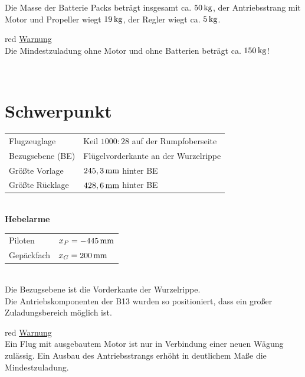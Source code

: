 \vspace{0.5cm}
Die Masse der Batterie Packs beträgt insgesamt ca. $\unit[50]{kg}$, der Antriebsstrang mit Motor und Propeller wiegt $\unit[19]{kg}$, der Regler wiegt ca. $\unit[5]{kg}$.\\

\begin{color}{red}
\large{\underline{Warnung}}\\
Die Mindestzuladung ohne Motor und ohne Batterien beträgt ca. $\unit[150]{kg}$!
\end{color}\\


\section{Schwerpunkt}
\begin{tabular}{l l}
Flugzeuglage & Keil $1000:28$ auf der Rumpfoberseite\\
Bezugsebene (BE) & Flügelvorderkante an der Wurzelrippe \\
Größte Vorlage & $\unit[245,3]{mm}$ hinter BE\\
Größte Rücklage & $\unit[428,6]{mm}$ hinter BE\\
\end{tabular}\\

\vspace{0.5cm}
\textbf{Hebelarme}\\
\begin{tabular}{m{} m{3cm}}
Piloten & $x_P=\unit[-445]{mm}$\\
Gepäckfach & $x_G=\unit[200]{mm}$\\
\end{tabular}\\

Die Bezugsebene ist die Vorderkante der Wurzelrippe.\\

Die Antriebskomponenten der B13 wurden so positioniert, dass ein großer Zuladungsbereich möglich ist. \\


\begin{color}{red}
\large{\underline{Warnung}}\\
Ein Flug mit ausgebautem Motor ist nur in Verbindung einer neuen Wägung zulässig. Ein Ausbau des Antriebsstrangs erhöht in deutlichem Maße die Mindestzuladung.
\end{color}\\



